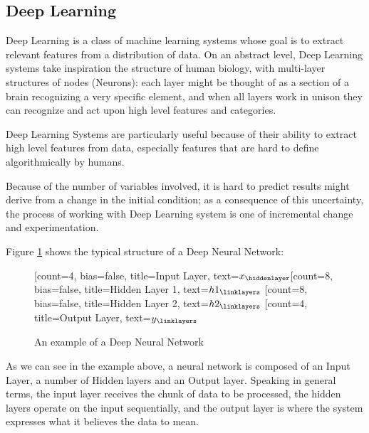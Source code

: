 \subsection{Deep Learning}
Deep Learning is a class of machine learning systems whose goal is to extract relevant features from a distribution of data. On an abstract level, Deep Learning systems take inspiration the structure of human biology, with multi-layer structures of nodes (Neurons): each layer might be thought of as a section of a brain recognizing a very specific element, and when all layers work in unison they can recognize and act upon high level features and categories.


Deep Learning Systems are particularly useful because of their ability to extract high level features from data, especially features that are hard to define algorithmically by humans.

Because of the number of variables involved, it is hard to predict results might derive from a change in the initial condition; as a consequence of this uncertainty, the process of working with Deep Learning system is one of incremental change and experimentation. 

Figure \ref{fig:DNN} shows the typical structure of a Deep Neural Network:
\begin{figure}[H]
\centering    
\begin{neuralnetwork}[height=8]
\newcommand{\x}[2]{$x_#2$}
\newcommand{\y}[2]{$y_#2$}
\newcommand{\hfirst}[2]{\small $h1_#2$}
\newcommand{\hsecond}[2]{\small $h2_#2$}
[count=4, bias=false, title=Input Layer, text=\x]
\hiddenlayer[count=8, bias=false, title=Hidden Layer 1, text=\hfirst] \linklayers
\hiddenlayer[count=8, bias=false, title=Hidden Layer 2, text=\hsecond] \linklayers
\outputlayer[count=4, title=Output Layer, text=\y] \linklayers
\end{neuralnetwork}
\caption{An example of a Deep Neural Network}\label{fig:DNN}
\end{figure}
As we can see in the example above, a neural network is composed of an Input Layer, a number of Hidden layers and an Output layer.
Speaking in general terms, the input layer receives the chunk of data to be processed, the hidden layers operate on the input sequentially, and the output layer is where the system expresses what it believes the data to mean.

